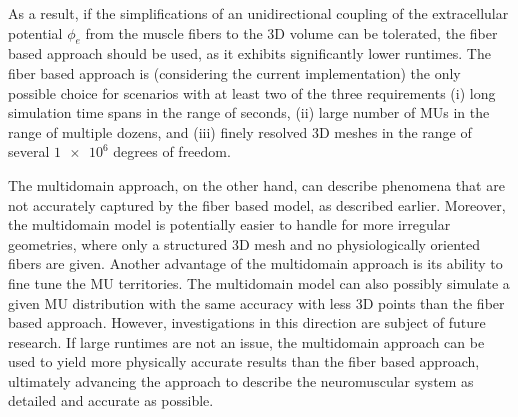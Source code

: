 As a result, if the simplifications of an unidirectional coupling of the extracellular potential $\phi_e$ from the muscle fibers to the 3D volume can be tolerated, the fiber based approach should be used, as it exhibits significantly lower runtimes. The fiber based approach is (considering the current implementation) the only possible choice for scenarios with at least two of the three requirements (i) long simulation time spans in the range of seconds, (ii) large number of MUs in the range of multiple dozens, and (iii) finely resolved 3D meshes in the range of several $\num{1e6}$ degrees of freedom.
 
The multidomain approach, on the other hand, can describe phenomena that are not accurately captured by the fiber based model, as described earlier.
Moreover, the multidomain model is potentially easier to handle for more irregular geometries, where only a structured 3D mesh and no physiologically oriented fibers are given. Another advantage of the multidomain approach is its ability to fine tune the MU territories. 
The multidomain model can also possibly simulate a given MU distribution with the same accuracy with less 3D points than the fiber based approach. However, investigations in this direction are subject of future research.
If large runtimes are not an issue, the multidomain approach can be used to yield more physically accurate results than the fiber based approach, ultimately advancing the approach to describe the neuromuscular system as detailed and accurate as possible.







